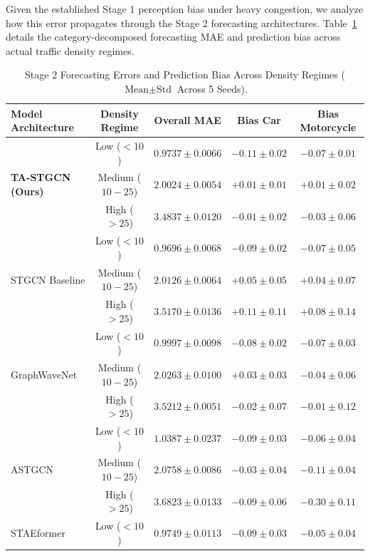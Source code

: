 \documentclass[a4paper,fleqn]{cas-sc}
\begin{document}
Given the established Stage 1 perception bias under heavy congestion, we analyze how this error propagates through the Stage 2 forecasting architectures. Table~\ref{tab:stage2_density_decomposed} details the category-decomposed forecasting MAE and prediction bias across actual traffic density regimes.

\begin{table}[pos=htbp]
\centering
\footnotesize
\setlength{\tabcolsep}{4pt}
\renewcommand{\arraystretch}{1.1}
\caption{Stage 2 Forecasting Errors and Prediction Bias Across Density Regimes ($\text{Mean} \pm \text{Std}$ Across 5 Seeds).}
\label{tab:stage2_density_decomposed}
\begin{tabular}{lcccc}
\toprule
\textbf{Model Architecture} & \textbf{Density Regime} & \textbf{Overall MAE} & \textbf{Bias Car} & \textbf{Bias Motorcycle} \\
\midrule
\multirow{3}{*}{\textbf{TA-STGCN (Ours)}} & Low ($<10$) & $0.9737 \pm 0.0066$ & $-0.11 \pm 0.02$ & $-0.07 \pm 0.01$ \\
 & Medium ($10-25$) & $2.0024 \pm 0.0054$ & $+0.01 \pm 0.01$ & $+0.01 \pm 0.02$ \\
 & High ($>25$) & $\mathbf{3.4837 \pm 0.0120}$ & $\mathbf{-0.01 \pm 0.02}$ & $\mathbf{-0.03 \pm 0.06}$ \\
\midrule
\multirow{3}{*}{STGCN Baseline} & Low ($<10$) & $0.9696 \pm 0.0068$ & $-0.09 \pm 0.02$ & $-0.07 \pm 0.05$ \\
 & Medium ($10-25$) & $2.0126 \pm 0.0064$ & $+0.05 \pm 0.05$ & $+0.04 \pm 0.07$ \\
 & High ($>25$) & $3.5170 \pm 0.0136$ & $+0.11 \pm 0.11$ & $+0.08 \pm 0.14$ \\
\midrule
\multirow{3}{*}{GraphWaveNet} & Low ($<10$) & $0.9997 \pm 0.0098$ & $-0.08 \pm 0.02$ & $-0.07 \pm 0.03$ \\
 & Medium ($10-25$) & $2.0263 \pm 0.0100$ & $+0.03 \pm 0.03$ & $-0.04 \pm 0.06$ \\
 & High ($>25$) & $3.5212 \pm 0.0051$ & $-0.02 \pm 0.07$ & $-0.01 \pm 0.12$ \\
\midrule
\multirow{3}{*}{ASTGCN} & Low ($<10$) & $1.0387 \pm 0.0237$ & $-0.09 \pm 0.03$ & $-0.06 \pm 0.04$ \\
 & Medium ($10-25$) & $2.0758 \pm 0.0086$ & $-0.03 \pm 0.04$ & $-0.11 \pm 0.04$ \\
 & High ($>25$) & $3.6823 \pm 0.0133$ & $-0.09 \pm 0.06$ & $-0.30 \pm 0.11$ \\
\midrule
\multirow{3}{*}{STAEformer} & Low ($<10$) & $0.9749 \pm 0.0113$ & $-0.09 \pm 0.03$ & $-0.05 \pm 0.04$ \\

\end{tabular}
\end{table}
\end{document}

